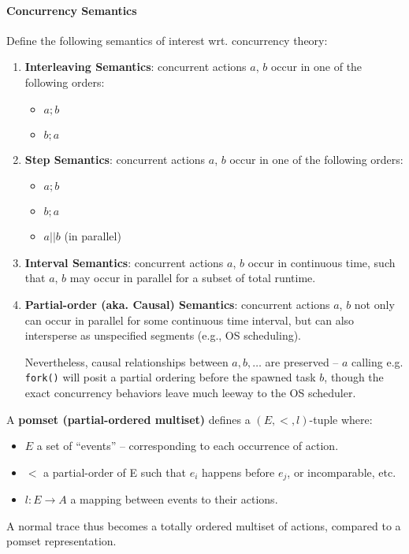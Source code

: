 \documentclass[99-notes-packed.tex]{subfiles}
\begin{document}
\paragraph*{Concurrency Semantics} Define the following semantics of interest wrt. concurrency theory: 
\begin{enumerate}
    \item {
        \textbf{Interleaving Semantics}: concurrent actions $a$, $b$ occur in one of the following orders: 
        \begin{itemize}
            \item $a; b$
            \item $b; a$
        \end{itemize}
    }
    \item {
        \textbf{Step Semantics}: concurrent actions $a$, $b$ occur in one of the following orders: 
        \begin{itemize}
            \item $a; b$
            \item $b; a$
            \item $a || b$ (in parallel)
        \end{itemize}
    }
    \item {
        \textbf{Interval Semantics}: concurrent actions $a$, $b$ occur in continuous time, such that $a$, $b$ may occur in parallel for a subset of total runtime. 
    }
    \item {
        \textbf{Partial-order (aka. Causal) Semantics}: concurrent actions $a$, $b$ not only can occur in parallel for some continuous time interval, but can also intersperse as unspecified segments (e.g., OS scheduling). 

        Nevertheless, causal relationships between $a, b, \dots$ are preserved -- $a$ calling e.g. \texttt{fork()} will posit a partial ordering before the spawned task $b$, though the exact concurrency behaviors leave much leeway to the OS scheduler.
    }
\end{enumerate}

\begin{definition}[Pomset]
    A \textbf{pomset (partial-ordered multiset)} defines a $(E, <, l)$-tuple where:
    \begin{itemize}
        \item $E$ a set of ``events'' -- corresponding to each occurrence of action. 
        \item $<$ a partial-order of E such that $e_i$ happens before $e_j$, or incomparable, etc.
        \item $l: E \rightarrow A$ a mapping between events to their actions. 
    \end{itemize}

    A normal trace thus becomes a totally ordered multiset of actions, compared to a pomset representation. 
\end{definition}
\end{document}
